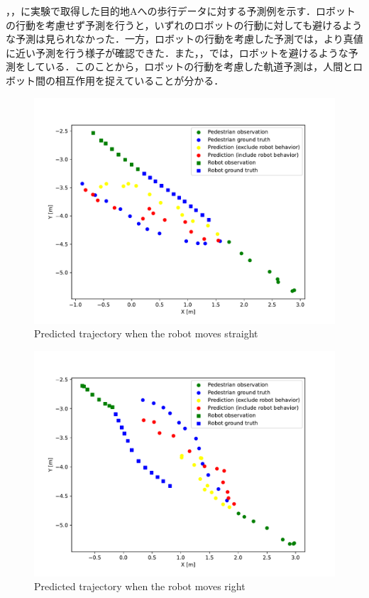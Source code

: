 ，，に実験で取得した目的地Aへの歩行データに対する予測例を示す．ロボットの行動を考慮せず予測を行うと，いずれのロボットの行動に対しても避けるような予測は見られなかった．一方，ロボットの行動を考慮した予測では，より真値に近い予測を行う様子が確認できた．また，，では，ロボットを避けるような予測をしている．このことから，ロボットの行動を考慮した軌道予測は，人間とロボット間の相互作用を捉えていることが分かる．

\vspace{-10pt}

\begin{figure}[H]
  \centering
 \includegraphics[keepaspectratio, scale=0.58]
      {images/pred_straight.pdf}
\caption{Predicted trajectory when the robot moves straight}
 \label{Fig:pred-straight}
\end{figure}

\begin{figure}[H]
  \centering
 \includegraphics[keepaspectratio, scale=0.58]
      {images/pred_right.pdf}
\caption{Predicted trajectory when the robot moves right}
 \label{Fig:pred-right}
\end{figure}

